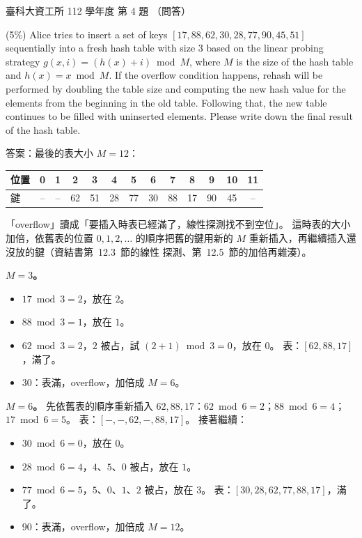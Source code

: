 \begin{pastexam}[label={px:ntust-112-ice-04}]{臺科大資工所 112 學年度 第 4 題}
（問答）

(5\%) Alice tries to insert a set of keys $[17,88,62,30,28,77,90,45,51]$ sequentially into a fresh
hash table with size 3 based on the linear probing strategy $g(x,i)=(h(x)+i)\bmod M$, where $M$ is
the size of the hash table and $h(x)=x\bmod M$. If the overflow condition happens, rehash will be
performed by doubling the table size and computing the new hash value for the elements from the
beginning in the old table. Following that, the new table continues to be filled with uninserted
elements. Please write down the final result of the hash table.
\end{pastexam}

\begin{pastsoln}
答案：最後的表大小 $M = 12$：
\begin{center}
\small
\begin{tabular}{l*{12}{c}}
\toprule
位置 & 0 & 1 & 2 & 3 & 4 & 5 & 6 & 7 & 8 & 9 & 10 & 11 \\
\midrule
鍵 & -- & -- & 62 & 51 & 28 & 77 & 30 & 88 & 17 & 90 & 45 & -- \\
\bottomrule
\end{tabular}
\end{center}

「overflow」讀成「要插入時表已經滿了，線性探測找不到空位」。 這時表的大小加倍，依舊表的位置
$0, 1, 2, \ldots$ 的順序把舊的鍵用新的 $M$ 重新插入，再繼續插入還沒放的鍵（資結書第~12.3~節的線性
探測、第~12.5~節的加倍再雜湊）。

\textbf{$M = 3$。}
\begin{itemize}
\item $17 \bmod 3 = 2$，放在 $2$。
\item $88 \bmod 3 = 1$，放在 $1$。
\item $62 \bmod 3 = 2$，$2$ 被占，試 $(2 + 1) \bmod 3 = 0$，放在 $0$。 表：$[62, 88, 17]$，滿了。
\item $30$：表滿，overflow，加倍成 $M = 6$。
\end{itemize}

\textbf{$M = 6$。} 先依舊表的順序重新插入 $62, 88, 17$：$62 \bmod 6 = 2$；$88 \bmod 6 = 4$；
$17 \bmod 6 = 5$。 表：$[-, -, 62, -, 88, 17]$。 接著繼續：
\begin{itemize}
\item $30 \bmod 6 = 0$，放在 $0$。
\item $28 \bmod 6 = 4$，$4$、$5$、$0$ 被占，放在 $1$。
\item $77 \bmod 6 = 5$，$5$、$0$、$1$、$2$ 被占，放在 $3$。 表：$[30, 28, 62, 77, 88, 17]$，滿了。
\item $90$：表滿，overflow，加倍成 $M = 12$。
\end{itemize}


\end{pastsoln}
